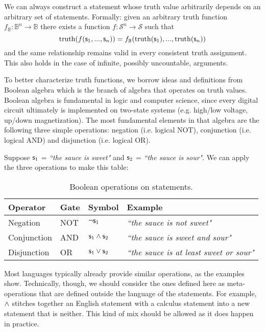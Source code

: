 \documentclass[11pt,letterpaper,fleqn]{memoir} %
\begin{document}
\begin{mathSection}

	\begin{axiom}\label{ax_functions_of_statement}
		We can always construct a statement whose truth value arbitrarily depends on an arbitrary set of statements. Formally: given an arbitrary truth function $f_{\mathbb{B}} : \mathbb{B}^n \to \mathbb{B}$ there exists a function $f : \mathcal{S}^n \to \mathcal{S}$ such that
		$$\operatorname{truth}(f(\mathsf{s}_1, ..., \mathsf{s}_n)) = f_{\mathbb{B}}(\operatorname{truth}(\mathsf{s}_1), ..., \operatorname{truth}(\mathsf{s}_n))$$
		and the same relationship remains valid in every consistent truth assignment. This also holds in the case of infinite, possibly uncountable, arguments.
	\end{axiom}
\end{mathSection}

To better characterize truth functions, we borrow ideas and definitions from Boolean algebra which is the branch of algebra that operates on truth values. Boolean algebra is fundamental in logic and computer science, since every digital circuit ultimately is implemented on two-state systems (e.g. high/low voltage, up/down magnetization).  The most fundamental elements in that algebra are the following three simple operations: negation (i.e. logical NOT), conjunction (i.e. logical AND) and disjunction (i.e. logical OR).

Suppose $\mathsf{s}_1$ = \emph{``the sauce is sweet"} and $\mathsf{s}_2$ = \emph{``the sauce is sour"}. We can apply the three operations to make this table:

\begin{table}[h]
	\centering
	\begin{tabular}{p{} p{} p{} p{}}
		Operator & Gate & Symbol & Example \\ 
		\hline 
		Negation & NOT & $\neg \mathsf{s}_1$ &  \emph{``the sauce is not sweet"} \\ 
		Conjunction & AND & $\mathsf{s}_1 \wedge \mathsf{s}_2$ & \emph{``the sauce is sweet and sour"} \\ 
		Disjunction & OR & $\mathsf{s}_1 \vee \mathsf{s}_2$ & \emph{``the sauce is at least sweet or sour"}
	\end{tabular} 
	\caption{Boolean operations on statements.}
\end{table}

Most languages typically already provide similar operations, as the examples show. Technically, though, we should consider the ones defined here as meta-operations that are defined outside the language of the statements. For example, $\wedge$ stitches together an English statement with a calculus statement into a new statement that is neither. This kind of mix should be allowed as it does happen in practice.
\end{document}
